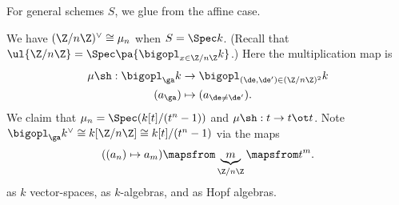 For general schemes $S$, we glue from the affine case.

\begin{ex}
We have $(\Z/n\Z)^{\vee} \cong \mu_n$ when $S=\Spec k$. (Recall that $\ul{\Z/n\Z} =\Spec\pa{\bigopl_{x\in \Z/n\Z} k}$.) Here the multiplication map is 
\begin{align*}
\mu\sh:\bigopl_{\ga} k &\to \bigopl_{(\de,\de')\in (\Z/n\Z)^2}k\\
(a_{\ga})&\mapsto (a_{\de\ne \de'}).
\end{align*}
We claim that $\mu_n=\Spec(k[t]/(t^n-1))$ and $\mu\sh:t\to t\ot t$. Note $\bigopl_{\ga}k^{\vee} \cong k[\Z/n\Z]\cong k[t]/(t^n-1)$  via the maps
\[
((a_n)\mapsto a_m)\mapsfrom \underbrace{m}_{\Z/n\Z} \mapsfrom t^m.
\]
as $k$ vector-spaces, as $k$-algebras, and as Hopf algebras.
\end{ex}
